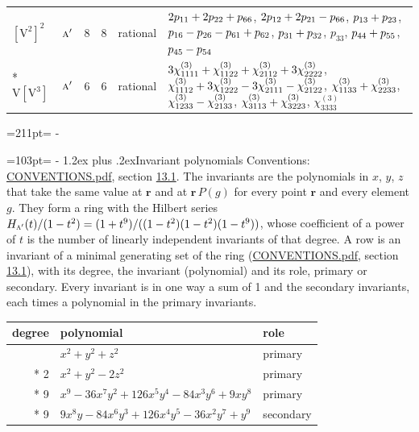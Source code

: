\documentclass[10pt,a4paper]{article}
\makeatletter
\renewcommand\section{\@startsection{section}{1}{\z@}{-3ex plus -1ex minus -.2ex}%
  {1.2ex plus .2ex}{\normalfont\large\sffamily\bfseries\color{parttitle}}}
\newcommand{\needspace}[1]{\par\penalty-100\begingroup\dimen0=#1\relax\dimen2=\pagegoal
  \advance\dimen2-\pagetotal\ifdim\dimen0>\dimen2\relax\ifdim\dimen2>0pt\vfil\break\fi\fi
  \endgroup}
\numberwithin{equation}{section}
\newcommand{\irr}[1]{\text{\normalfont\scshape #1}}
\newcommand{\pointr}{\mathbf{r}}
\newcommand{\jahn}[1]{\mathrm{#1}}
\newlength{\fillwidth}\newlength{\cellwidth}\newlength{\colwidth}
\newcommand{\signbreak}{\penalty100\relax}
\makeatother
\begin{document}
{\begin{longtable}{@{}llrrl>{\RaggedRight\arraybackslash}p{\fillwidth}@{}}
$\jahn{[V^{2}]^{2}}$ & $\irr{a}'$ & 8 & 8 & rational & $2p_{11} +\signbreak 2p_{22} +\signbreak p_{66}$, $2p_{12} +\signbreak 2p_{21} -\signbreak p_{66}$, $p_{13} +\signbreak p_{23}$, $p_{16} -\signbreak p_{26} -\signbreak p_{61} +\signbreak p_{62}$, $p_{31} +\signbreak p_{32}$, $p_{33}$, $p_{44} +\signbreak p_{55}$, $p_{45} -\signbreak p_{54}$\\*
$\jahn{V[V^{3}]}$ & $\irr{a}'$ & 6 & 6 & rational & $3\chi^{(3)}_{1111} +\signbreak \chi^{(3)}_{1122} +\signbreak \chi^{(3)}_{2112} +\signbreak 3\chi^{(3)}_{2222}$, $\chi^{(3)}_{1112} +\signbreak 3\chi^{(3)}_{1222} -\signbreak 3\chi^{(3)}_{2111} -\signbreak \chi^{(3)}_{2122}$, $\chi^{(3)}_{1133} +\signbreak \chi^{(3)}_{2233}$, $\chi^{(3)}_{1233} -\signbreak \chi^{(3)}_{2133}$, $\chi^{(3)}_{3113} +\signbreak \chi^{(3)}_{3223}$, $\chi^{(3)}_{3333}$\\
\bottomrule\end{longtable}}
\needspace{211pt}
\needspace{103pt}
\section{Invariant polynomials}\label{s:invariant_polynomials}
Conventions: \href{../../CONVENTIONS.pdf}{CONVENTIONS.pdf}, section \href{../../CONVENTIONS.pdf\#conv.13.1}{13.1}.
The invariants are the polynomials in $x$, $y$, $z$ that take the same value at $\pointr$ and at $\pointr\,P(g)$ for every point $\pointr$ and every element $g$. They form a ring with the Hilbert series $H_{\irr{a}'}(t)/(1-t^{2}) = (1 + t^{9})/((1-t^{2})(1-t^{2})(1-t^{9}))$, whose coefficient of a power of $t$ is the number of linearly independent invariants of that degree. \label{n:head.degree}\label{n:head.role}A row is an invariant of a minimal generating set of the ring (\href{../../CONVENTIONS.pdf}{CONVENTIONS.pdf}, section \href{../../CONVENTIONS.pdf\#conv.13.1}{13.1}), with its degree, the invariant (polynomial) and its role, primary or secondary. Every invariant is in one way a sum of 1 and the secondary invariants, each times a polynomial in the primary invariants.
{\small\begin{longtable}{@{}rll@{}}\toprule
degree & polynomial & role\\\midrule\endhead
\bottomrule\endfoot\endlastfoot
2 & $x^{2} + y^{2} + z^{2}$ & primary\\*
2 & $x^{2} + y^{2} - 2z^{2}$ & primary\\*
9 & $x^{9} - 36x^{7}y^{2} + 126x^{5}y^{4} - 84x^{3}y^{6} + 9xy^{8}$ & primary\\*
9 & $9x^{8}y - 84x^{6}y^{3} + 126x^{4}y^{5} - 36x^{2}y^{7} + y^{9}$ & secondary\\
\bottomrule\end{longtable}}
\end{document}
